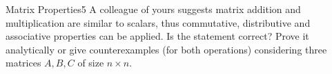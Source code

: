 \newif\ifvimbug
\vimbugfalse

\ifvimbug

\fi

 

\begin{questions}


\begin{question}{Matrix Properties}{5}
A colleague of yours suggests matrix addition and multiplication are similar to scalars, thus commutative, distributive and associative properties can be applied.
Is the statement correct? Prove it analytically or give counterexamples (for both operations) considering three matrices $ A, B, C$ of size $n\times n$.


\end{question}
\end{questions}
